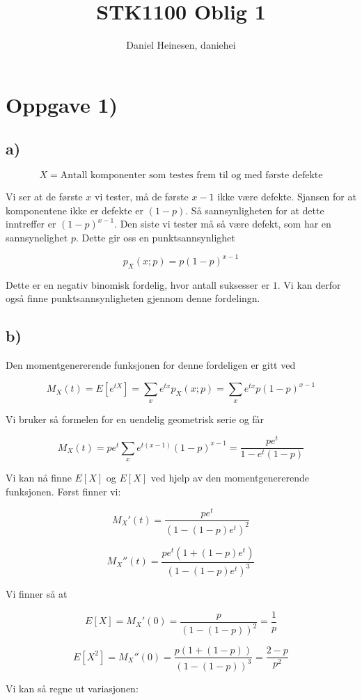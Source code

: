 \documentclass[a4paper,norsk, 10pt]{article}
\title{STK1100 Oblig 1}
\author{Daniel Heinesen, daniehei}
\begin{document}
\maketitle

\section*{Oppgave 1)}
\subsection*{a)}

$$
X = \text{Antall komponenter som testes frem til og med første defekte}
$$

Vi ser at de første $x$ vi tester, må de første $x-1$ ikke være defekte. Sjansen for at komponentene ikke er defekte er $(1-p)$. Så sannsynligheten for at dette inntreffer er $(1-p)^{x-1}$. Den siste vi tester må så være defekt, som har en sannsynelighet $p$. Dette gir oss en punktsannsynlighet

$$
p_X(x;p) = p(1-p)^{x-1}
$$

Dette er en negativ binomisk fordelig, hvor antall suksesser er $1$. Vi kan derfor også finne punktsannsynligheten gjennom denne fordelingn.

\subsection*{b)}
Den momentgenererende funksjonen for denne fordeligen er gitt ved

$$
M_X(t) = E[e^{tX}] = \sum_x e^{tx}p_X(x;p) = \sum_x e^{tx}p(1-p)^{x-1}
$$

Vi bruker så formelen for en uendelig geometrisk serie og får

$$
M_X(t) = pe^t\sum_x e^{t(x-1)}(1-p)^{x-1} = \frac{pe^t}{1-e^t(1-p)}
$$

Vi kan nå finne $E[X]$ og $E[X]$ ved hjelp av den momentgenererende funksjonen. Først finner vi:

$$
M_X'(t) = \frac{pe^t}{(1-(1-p)e^t)^2}
$$

$$
M_X''(t) = \frac{pe^t(1+(1-p)e^t)}{(1-(1-p)e^t)^3}
$$

Vi finner så at

$$
E[X] = M_X'(0) = \frac{p}{(1-(1-p))^2} = \frac{1}{p}
$$

$$
E[X^2] = M_X''(0) = \frac{p(1+(1-p))}{(1-(1-p))^3} = \frac{2-p}{p^2}
$$

Vi kan så regne ut variasjonen:
\end{document}
